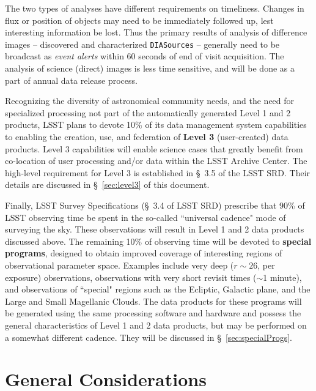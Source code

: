 \documentclass[12pt]{article}
\newcommand{\code}[1]{\texttt{#1}}
\newcommand{\DIASources}{\code{DIASources}\xspace}
\newcommand{\req}[1]{\marginpar{\tiny #1}}
\newcommand{\dmreq}[1]{\req{DMS-REQ-#1}}
\begin{document}
The two types of analyses have different requirements on timeliness. Changes in flux or position of objects may need to be immediately followed up, lest interesting information be lost. Thus the primary results of analysis of difference images -- discovered and characterized \DIASources{} -- generally need to be broadcast as {\em event alerts} within 60 seconds\req{OTT1} of end of visit acquisition.\dmreq{0004} The analysis of science (direct) images is less time sensitive, and will be done as a part of annual data release process.

\vspace{1em}

Recognizing the diversity of astronomical community needs, and the need for specialized processing not part of the automatically generated Level 1 and 2 products, LSST plans to devote 10\% of its data management system capabilities to enabling the creation, use, and federation of {\bf Level 3} (user-created) data products. Level 3 capabilities will enable science cases that greatly benefit from co-location of user processing and/or data within the LSST Archive Center. The high-level requirement for Level 3 is established in \S~3.5 of the LSST SRD. Their details are discussed in \S~\ref{sec:level3} of this document.

\vspace{1em}

Finally, LSST Survey Specifications (\S~3.4 of LSST SRD) prescribe that 90\% of LSST observing time be spent in the so-called ``universal cadence" mode of surveying the sky. These observations will result in Level 1 and 2 data products discussed above. The remaining 10\% of observing time will be devoted to {\bf special programs}, designed to obtain improved coverage of interesting regions of observational parameter space. Examples include very deep ($r \sim 26$, per exposure) observations, observations with very short revisit times ($\sim$1 minute), and observations of ``special" regions such as the Ecliptic, Galactic plane, and the Large and Small Magellanic Clouds. The data products for these programs will be generated using the same processing software and hardware and possess the general characteristics of Level 1 and 2 data products, but may be performed on a somewhat different cadence. They will be discussed in \S~\ref{sec:specialProgs}.


\section{General Considerations}
\end{document}
